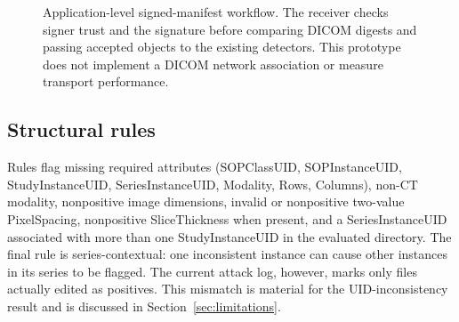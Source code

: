 \documentclass[journal]{IEEEtran}
\begin{document}
  \begin{figure}[t]
  \centering
  \caption{Application-level signed-manifest workflow. The receiver checks signer trust and the signature before comparing DICOM digests and passing accepted objects to the existing detectors. This prototype does not implement a DICOM network association or measure transport performance.}
  \label{fig:signed_manifest_workflow}
  \end{figure}
  
  \subsection{Structural rules}
  Rules flag missing required attributes (SOPClassUID, SOPInstanceUID, StudyInstanceUID, SeriesInstanceUID, Modality, Rows, Columns), non-CT modality, nonpositive image dimensions, invalid or nonpositive two-value PixelSpacing, nonpositive SliceThickness when present, and a SeriesInstanceUID associated with more than one StudyInstanceUID in the evaluated directory. The final rule is series-contextual: one inconsistent instance can cause other instances in its series to be flagged. The current attack log, however, marks only files actually edited as positives. This mismatch is material for the UID-inconsistency result and is discussed in Section~\ref{sec:limitations}.
  
\end{document}
